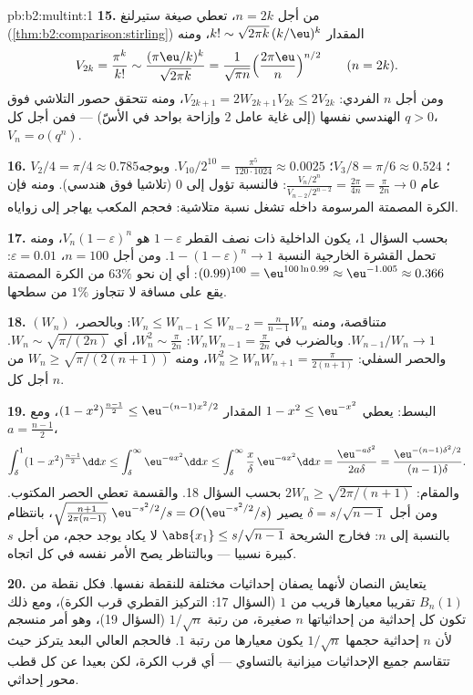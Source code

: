 \begin{solution}{pb:b2:multint:1}
\textbf{15.} من أجل $n = 2k$، تعطي صيغة ستيرلنغ (\cref{thm:b2:comparison:stirling}) المقدار
$k! \sim
\sqrt{2\pi k}\,(k/\eu)^k$، ومنه
\[
V_{2k} = \frac{\pi^k}{k!}
\sim \frac{(\pi\eu/k)^k}{\sqrt{2\pi k}}
= \frac1{\sqrt{\pi n}}\Bigl(\frac{2\pi\eu}n\Bigr)^{n/2}
\qquad (n = 2k).
\]
ومن أجل $n$ الفردي: $V_{2k+1} = 2W_{2k+1}V_{2k} \leq 2V_{2k}$، ومنه تتحقق حصور التلاشي فوق الهندسي
نفسها (إلى غاية عامل $2$ وإزاحة بواحد في الأسّ) --- فمن أجل كل
$q >
0$، $V_n = o(q^n)$.

\textbf{16.} $V_2/4 = \pi/4 \approx 0.785$؛ $V_3/8 = \pi/6
\approx 0.524$؛ $V_{10}/2^{10} = \frac{\pi^5}{120\cdot1024}
\approx 0.0025$. وبوجه عام $\frac{V_n/2^n}{V_{n-2}/2^{n-2}}
= \frac{2\pi}{4n} = \frac{\pi}{2n} \to 0$: فالنسبة
تؤول إلى $0$ (تلاشيا فوق هندسي). ومنه فإن الكرة المصمتة المرسومة
داخله تشغل نسبة متلاشية: فحجم المكعب يهاجر إلى زواياه.

\textbf{17.} بحسب السؤال 1، يكون  الداخلية ذات نصف
القطر $1 -
\varepsilon$ هو $V_n(1-\varepsilon)^n$، ومنه تحمل القشرة الخارجية النسبة $1 - (1 - \varepsilon)^n \to 1$.
ومن أجل $n = 100$، $\varepsilon = 0.01$: $(0.99)^{100} =
\eu^{100\ln0.99} \approx \eu^{-1.005} \approx 0.366$: أي إن نحو $63\%$ من الكرة المصمتة
يقع على مسافة لا تتجاوز $1\%$ من سطحها.

\textbf{18.} $(W_n)$ متناقصة، ومنه $W_n \leq W_{n-1} \leq
W_{n-2} = \frac{n}{n-1}W_n$: وبالحصر، $W_{n-1}/W_n \to 1$. وبالضرب
في $W_nW_{n-1} = \frac\pi{2n}$: $W_n^2 \sim
\frac\pi{2n}$، أي $W_n \sim \sqrt{\pi/(2n)}$. والحصر السفلي: $W_n^2 \geq W_nW_{n+1} = \frac{\pi}{2(n+1)}$، ومنه $W_n \geq
\sqrt{\pi/(2(n+1))}$
من أجل كل $n$.

\textbf{19.} البسط: يعطي $1 - x^2 \leq \eu^{-x^2}$ المقدار $(1 -
x^2)^{\frac{n-1}2} \leq \eu^{-(n-1)x^2/2}$، ومع $a =
\frac{n-1}2$،
\[
\int_\delta^1(1 - x^2)^{\frac{n-1}2}\dd x
\leq \int_\delta^\infty\eu^{-ax^2}\dd x
\leq \int_\delta^\infty\frac x\delta\,\eu^{-ax^2}\dd x
= \frac{\eu^{-a\delta^2}}{2a\delta}
= \frac{\eu^{-(n-1)\delta^2/2}}{(n-1)\delta}.
\]
والمقام: $2W_n \geq \sqrt{2\pi/(n+1)}$ بحسب السؤال 18. والقسمة تعطي الحصر المكتوب. ومن أجل
$\delta =
s/\sqrt{n-1}$ يصير $\sqrt{\tfrac{n+1}{2\pi(n-1)}}\;\eu^{-s^2/2}/s = O\bigl(
\eu^{-s^2/2}/s\bigr)$، بانتظام بالنسبة إلى $n$: فخارج الشريحة
$\abs{x_1} \leq s/\sqrt{n-1}$ لا يكاد يوجد حجم، من أجل $s$ كبيرة نسبيا --- وبالتناظر
يصح الأمر نفسه في كل اتجاه.

\textbf{20.} يتعايش النصان لأنهما يصفان إحداثيات مختلفة للنقطة
نفسها. فكل نقطة من $B_n(1)$ تقريبا معيارها قريب من $1$ (السؤال
17: التركيز القطري قرب الكرة)، ومع ذلك تكون كل إحداثية من إحداثياتها
$n$ صغيرة، من رتبة $1/\sqrt n$ (السؤال 19)، وهو أمر منسجم لأن $n$
إحداثية حجمها $1/\sqrt n$ يكون معيارها من رتبة $1$. فالحجم العالي
البعد يتركز حيث تتقاسم جميع الإحداثيات ميزانية  بالتساوي ---
أي قرب الكرة، لكن بعيدا عن كل قطب محور إحداثي.


\end{solution}
